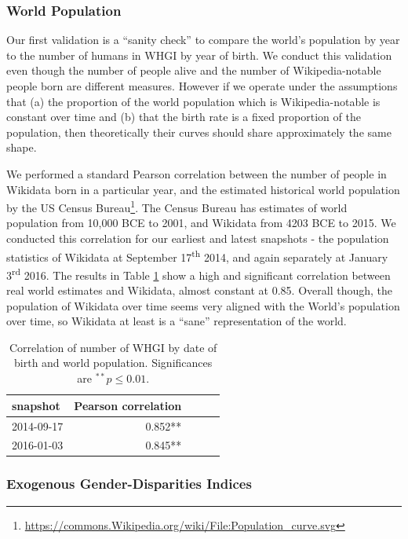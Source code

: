 \documentclass{sig-alternate-05-2015}
\begin{document}
\subsubsection{World Population} Our first validation is a ``sanity check'' to compare the world's population by year to the number of humans in WHGI by year of birth. We conduct this validation even though the number of people alive and the number of Wikipedia-notable people born are different measures. However if we operate under the assumptions that (a) the proportion of the world population which is Wikipedia-notable is constant over time and (b) that the birth rate is a fixed proportion of the population, then theoretically their curves should share approximately the same shape.

We performed a standard Pearson correlation between the number of people in Wikidata born in a particular year, and the estimated historical world population by the US Census
Bureau\footnote{\url{https://commons.Wikipedia.org/wiki/File:Population_curve.svg}}. The Census Bureau has estimates of world population from 10,000 BCE to 2001, and Wikidata from 4203 BCE to 2015. We conducted this correlation for our earliest and latest snapshots - the population statistics of Wikidata at September 17\textsuperscript{th} 2014, and again separately at January 3\textsuperscript{rd} 2016. The results in Table \ref{table:worldpop} show a high and significant correlation between real world estimates and Wikidata, almost constant at 0.85. Overall though, the population of Wikidata over time seems very aligned with the World's population over time, so Wikidata at least is a ``sane'' representation of the world.

\begin{table}
\caption{Correlation of number of WHGI by date of birth and world population. Significances are $ ^{**}p\leq 0.01$.}
\label{table:worldpop}
\begin{tabular}{lrrrr}
\toprule
snapshot &  Pearson correlation \\
\midrule
2014-09-17 & 0.852**  \\
2016-01-03 & 0.845**  \\
\bottomrule
\end{tabular}
\end{table}

\subsubsection{Exogenous Gender-Disparities Indices}
\end{document}
